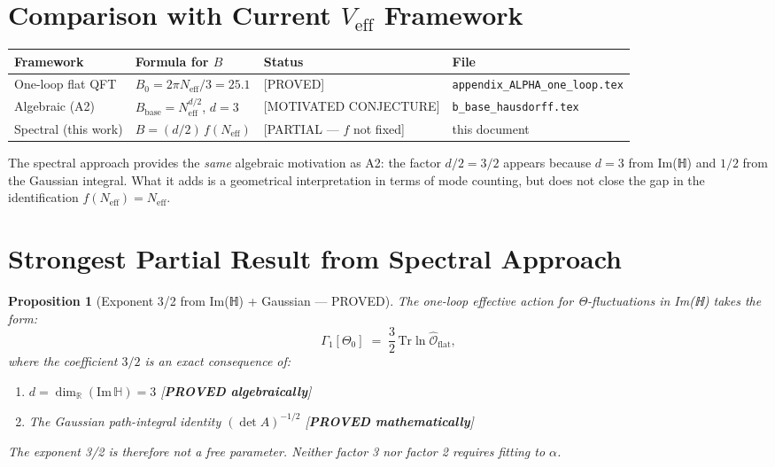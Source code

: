 \documentclass[11pt,a4paper]{article}
\newtheorem{proposition}{Proposition}
\theoremstyle{definition}
\theoremstyle{remark}
\begin{document}
\section{Comparison with Current $V_{\mathrm{eff}}$ Framework}
\label{sec:comparison}

\begin{center}
\begin{tabular}{llll}
  \toprule
  Framework & Formula for $B$ & Status & File \\
  \midrule
  One-loop flat QFT & $B_0 = 2\pi N_{\mathrm{eff}}/3 = 25.1$ & [PROVED] & \texttt{appendix\_ALPHA\_one\_loop.tex} \\
  Algebraic (A2) & $B_{\mathrm{base}} = N_{\mathrm{eff}}^{d/2}$, $d=3$ & [MOTIVATED CONJECTURE] & \texttt{b\_base\_hausdorff.tex} \\
  Spectral (this work) & $B = (d/2)\,f(N_{\mathrm{eff}})$ & [PARTIAL — $f$ not fixed] & this document \\
  \bottomrule
\end{tabular}
\end{center}

The spectral approach provides the \emph{same} algebraic motivation as A2:
the factor $d/2 = 3/2$ appears because $d = 3$ from Im(ℍ) and
$1/2$ from the Gaussian integral.
What it adds is a geometrical interpretation in terms of mode counting,
but does not close the gap in the identification $f(N_{\mathrm{eff}}) = N_{\mathrm{eff}}$.

\section{Strongest Partial Result from Spectral Approach}
\label{sec:partial}

\begin{proposition}[Exponent 3/2 from Im(ℍ) + Gaussian — PROVED]
\label{prop:3half}
  The one-loop effective action for Θ-fluctuations in Im(ℍ) takes the form:
  \begin{equation}
    \Gamma_1[\Theta_0] \;=\; \frac{3}{2}\,\mathrm{Tr}\!\ln\hat{\mathcal{O}}_{\mathrm{flat}},
    \label{eq:Gamma1_final}
  \end{equation}
  where the coefficient $3/2$ is an exact consequence of:
  \begin{enumerate}
    \item $d = \dim_\mathbb{R}(\mathrm{Im}\,\mathbb{H}) = 3$ [\textbf{PROVED algebraically}]
    \item The Gaussian path-integral identity $(\det A)^{-1/2}$ [\textbf{PROVED mathematically}]
  \end{enumerate}
  The exponent 3/2 is therefore not a free parameter.
  \emph{Neither factor 3 nor factor 2 requires fitting to $\alpha$.}
\end{proposition}
\end{document}
